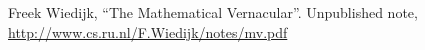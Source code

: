\begin{thebibliography}{99}
 Freek Wiedijk,
  ``The Mathematical Vernacular''. Unpublished note,
  \url{http://www.cs.ru.nl/F.Wiedijk/notes/mv.pdf}
\end{thebibliography}
